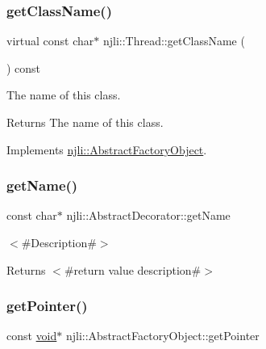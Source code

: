 \mbox{\label{classnjli_1_1_thread_a212e294b12cb653e82d9e4ab96ebf006}} 
\subsubsection{\texorpdfstring{get\+Class\+Name()}{getClassName()}}
{\footnotesize\ttfamily virtual const char$\ast$ njli\+::\+Thread\+::get\+Class\+Name (\begin{DoxyParamCaption}{ }\end{DoxyParamCaption}) const\hspace{0.3cm}{\ttfamily [virtual]}}

The name of this class.

\begin{DoxyReturn}{Returns}
The name of this class. 
\end{DoxyReturn}


Implements \mbox{\hyperlink{classnjli_1_1_abstract_factory_object_af4151e41b80d5bc3fc42822c67fc2278}{njli\+::\+Abstract\+Factory\+Object}}.

\mbox{\label{classnjli_1_1_thread_ad41266885be835f3ee602311e20877a4}} 
\subsubsection{\texorpdfstring{get\+Name()}{getName()}}
{\footnotesize\ttfamily const char$\ast$ njli\+::\+Abstract\+Decorator\+::get\+Name}

$<$\#\+Description\#$>$

\begin{DoxyReturn}{Returns}
$<$\#return value description\#$>$ 
\end{DoxyReturn}
\mbox{\label{classnjli_1_1_thread_ac4ca71716ed832be357f15f8262c8448}} 
\subsubsection{\texorpdfstring{get\+Pointer()}{getPointer()}}
{\footnotesize\ttfamily const \mbox{\hyperlink{_thread_8h_af1e856da2e658414cb2456cb6f7ebc66}{void}}$\ast$ njli\+::\+Abstract\+Factory\+Object\+::get\+Pointer}

